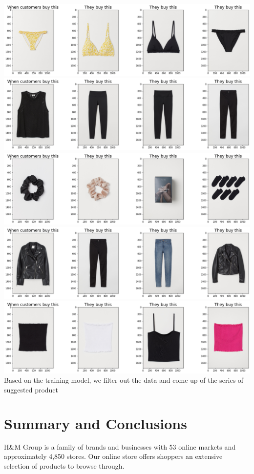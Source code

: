 \documentclass{article}
\begin{document}
\includegraphics[width=\textwidth]{images/finalprg5.png}
\includegraphics[width=\textwidth]{images/finalprg6.png}
\includegraphics[width=\textwidth]{images/finalprg7.png}
\includegraphics[width=\textwidth]{images/finalprg8.png}
\includegraphics[width=\textwidth]{images/finalprg9.png}
\\
Based on the training model, we filter out the data and come up of the series of suggested product 
\section{Summary and Conclusions}
H&M Group is a family of brands and businesses with 53 online markets and approximately 4,850 stores. Our online store offers shoppers an extensive selection of products to browse through. \\
\end{document}
